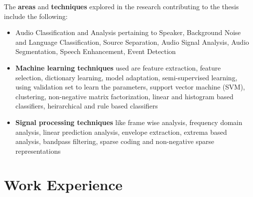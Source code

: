 \documentclass[line]{resume}
\begin{document}
{\begin{resume}
			
			The \textbf{areas} and \textbf{techniques} explored in the research contributing to the thesis include the following:
			
			\vspace{-3.5mm}
			\begin{itemize}
				\item Audio Classification and Analysis pertaining to Speaker, Background Noise and Language Classification, Source Separation, Audio Signal Analysis, Audio Segmentation, Speech Enhancement, Event Detection 
				\item  \textbf{Machine learning techniques} used are feature extraction, feature selection, dictionary learning, model adaptation, semi-supervised learning, using validation set to learn the parameters, support vector machine (SVM), clustering, non-negative matrix factorization, linear and histogram based classifiers, heirarchical  and rule based classifiers
				
				\item \textbf{Signal processing techniques} like frame wise analysis, frequency domain analysis, linear prediction analysis, envelope extraction, extrema based analysis, bandpass filtering, sparse coding and non-negative sparse representations
			\end{itemize}
			
			\section{\mysidestyle Work Experience}
		

\end{resume}}
\end{document}
